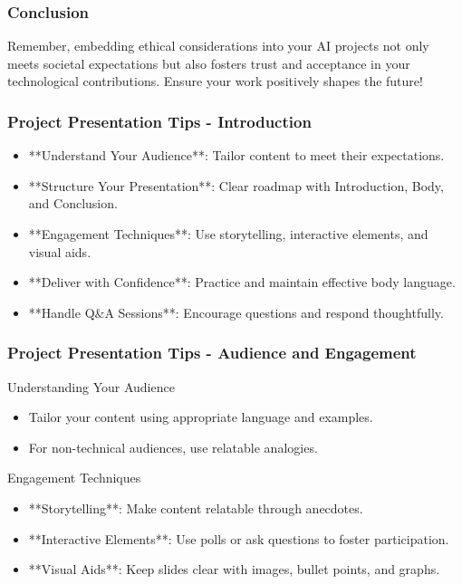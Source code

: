 \documentclass[aspectratio=169]{beamer}
\begin{document}
\begin{frame}[fragile]
    \frametitle{Conclusion}
    Remember, embedding ethical considerations into your AI projects not only meets societal expectations but also fosters trust and acceptance in your technological contributions. Ensure your work positively shapes the future!
\end{frame}

\begin{frame}[fragile]
    \frametitle{Project Presentation Tips - Introduction}
    \begin{itemize}
        \item **Understand Your Audience**: Tailor content to meet their expectations.
        \item **Structure Your Presentation**: Clear roadmap with Introduction, Body, and Conclusion.
        \item **Engagement Techniques**: Use storytelling, interactive elements, and visual aids.
        \item **Deliver with Confidence**: Practice and maintain effective body language.
        \item **Handle Q\&A Sessions**: Encourage questions and respond thoughtfully.
    \end{itemize}
\end{frame}

\begin{frame}[fragile]
    \frametitle{Project Presentation Tips - Audience and Engagement}
    \begin{block}{Understanding Your Audience}
        \begin{itemize}
            \item Tailor your content using appropriate language and examples.
            \item For non-technical audiences, use relatable analogies.
        \end{itemize}
    \end{block}

    \begin{block}{Engagement Techniques}
        \begin{itemize}
            \item **Storytelling**: Make content relatable through anecdotes.
            \item **Interactive Elements**: Use polls or ask questions to foster participation.
            \item **Visual Aids**: Keep slides clear with images, bullet points, and graphs.
        \end{itemize}
    \end{block}
\end{frame}
\end{document}
